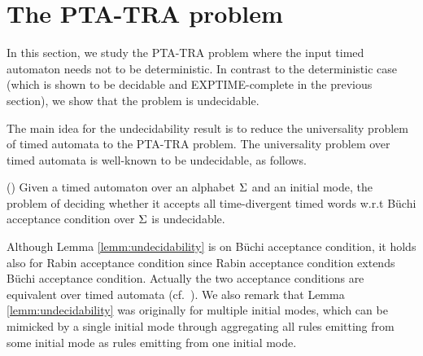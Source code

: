 \vspace{-1.8em}
\section{The PTA-TRA problem}
\vspace{-1em}
In this section, we study the PTA-TRA problem where the input timed automaton needs not to be deterministic.
In contrast to the deterministic case (which is shown to be decidable and EXPTIME-complete in the previous section),
we show that the problem is undecidable.

\smallskip
{} The main idea for the undecidability result is to reduce the universality problem of timed automata to the PTA-TRA problem. The universality problem over timed automata is well-known to be undecidable, as follows.

%
%
\begin{lemma}{(\cite[Theorem 5.2]{DBLP:journals/tcs/AlurD94})}\label{lemm:undecidability}
Given a timed automaton over an alphabet $\Sigma$ and an initial mode, the problem of deciding whether it accepts all time-divergent timed words w.r.t B\"{u}chi acceptance condition over $\Sigma$ is undecidable.
\end{lemma}
%
Although Lemma \ref{lemm:undecidability} is on  B\"{u}chi acceptance condition, it holds also for Rabin acceptance condition since Rabin acceptance condition extends  B\"{u}chi acceptance condition.
Actually the two acceptance conditions are equivalent over timed automata (cf.~\cite[Theorem 3.20]{DBLP:journals/tcs/AlurD94}). We also remark that Lemma \ref{lemm:undecidability} was originally for multiple initial modes, which can be mimicked by a single initial mode through aggregating all rules emitting from some initial mode as rules emitting from one initial mode.

